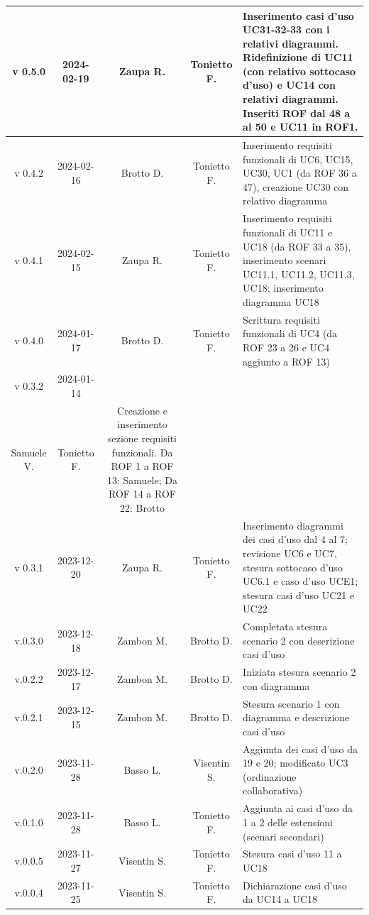 \documentclass[12pt, oneside]{article}
\begin{document}
\begin{longtable}{|c|c|c|c|p{7cm}|}
\hline
v 0.5.0 & 2024-02-19 & Zaupa R. & Tonietto F. & Inserimento casi d'uso UC31-32-33 con i relativi diagrammi. Ridefinizione di UC11 (con relativo sottocaso d'uso) e UC14 con relativi diagrammi. Inseriti ROF dal 48 a al 50 e UC11 in ROF1. \\
\hline
v 0.4.2 & 2024-02-16 & Brotto D. & Tonietto F. & Inserimento requisiti funzionali di UC6, UC15, UC30, UC1 (da ROF 36 a 47), creazione UC30 con relativo diagramma \\
\hline
v 0.4.1 & 2024-02-15 & Zaupa R. & Tonietto F. & Inserimento requisiti funzionali di UC11 e UC18 (da ROF 33 a 35), inserimento scenari UC11.1, UC11.2, UC11.3, UC18; inserimento diagramma UC18 \\
\hline
v 0.4.0 & 2024-01-17 & Brotto D. & Tonietto F. & Scrittura requisiti funzionali di UC4 (da ROF 23 a 26 e UC4 aggiunto a ROF 13) \\
\hline
v 0.3.2 & 2024-01-14 & 
\begin{tabular}[c]{@{}c@{}}
    Davide B. \\
    Samuele V.
  \end{tabular} 
& Tonietto F. & Creazione e inserimento sezione requisiti funzionali. Da ROF 1 a ROF 13: Samuele; Da ROF 14 a ROF 22: Brotto\\
\hline
v 0.3.1 & 2023-12-20 & Zaupa R. & Tonietto F. & Inserimento diagrammi dei casi d'uso dal 4 al 7; revisione  UC6 e UC7, stesura sottocaso d'uso UC6.1 e caso d'uso UCE1; stesura casi d'uso UC21 e UC22 \\
\hline
v.0.3.0 & 2023-12-18 & Zambon M. & Brotto D. & Completata stesura scenario 2 con descrizione casi d'uso \\
\hline
v.0.2.2 & 2023-12-17 & Zambon M. & Brotto D. & Iniziata stesura scenario 2 con diagramma \\
\hline
v.0.2.1 & 2023-12-15 & Zambon M. & Brotto D. & Stesura scenario 1 con diagramma e descrizione casi d'uso \\
\hline
v.0.2.0 & 2023-11-28 & Basso L. & Visentin S. & Aggiunta dei casi d'uso da 19 e 20; modificato UC3 (ordinazione collaborativa) \\
\hline
v.0.1.0 & 2023-11-28 & Basso L. & Tonietto F. & Aggiunta ai casi d'uso da 1 a 2 delle estensioni (scenari secondari) \\
\hline
v.0.0.5 & 2023-11-27 & Visentin S. & Tonietto F. & Stesura casi d'uso 11 a UC18 \\
\hline
v.0.0.4 & 2023-11-25 & Visentin S. & Tonietto F. & Dichiarazione casi d'uso da UC14 a UC18 \\

\end{longtable}
\end{document}
